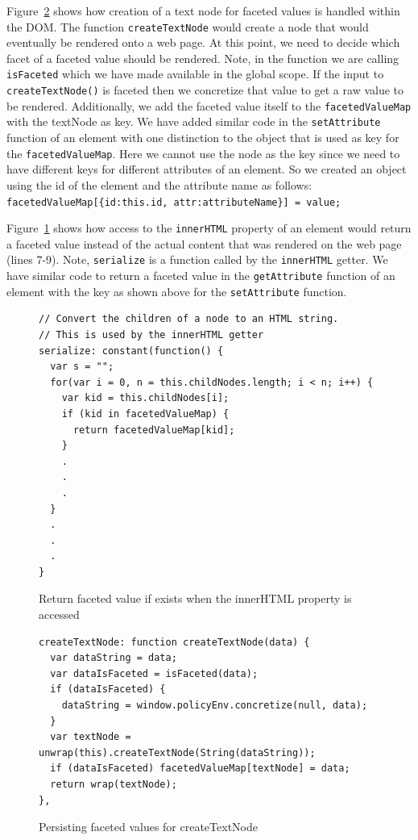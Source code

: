 Figure~\ref{fig:createTextNode} shows how creation of a text node for faceted values
is handled within the DOM. The function \texttt{createTextNode} would create a
node that would eventually be rendered onto a web page. At this point, we need to
decide which facet of a faceted value should be rendered. Note, in the function
we are calling \texttt{isFaceted} which we have made available in the global scope.
If the input to \texttt{createTextNode()} is faceted then we concretize that value
to get a raw value to be rendered. Additionally, we add the faceted value itself
to the \texttt{facetedValueMap} with the textNode as key. We have added similar
code in the \texttt{setAttribute} function of an element with one distinction to
the object that is used as key for the \texttt{facetedValueMap}. Here we cannot
use the node as the key since we need to have different keys for different
attributes of an element. So we created an object using the id of the element and
the attribute name as follows:
\indent\texttt{facetedValueMap[\{id:this.id, attr:attributeName\}] = value;}
\noindent

Figure~\ref{fig:innerHTML} shows how access to the \texttt{innerHTML} property of
an element would return a faceted value instead of the actual content that was
rendered on the web page (lines 7-9). Note, \texttt{serialize} is a function
called by the \texttt{innerHTML} getter. We have similar code to return a faceted
value in the \texttt{getAttribute} function of an element with the key as shown
above for the \texttt{setAttribute} function.

\begin{figure}
  \begin{lstlisting}
// Convert the children of a node to an HTML string.
// This is used by the innerHTML getter
serialize: constant(function() {
  var s = "";
  for(var i = 0, n = this.childNodes.length; i < n; i++) {
    var kid = this.childNodes[i];
    if (kid in facetedValueMap) {
      return facetedValueMap[kid];
    }
    .
    .
    .
  }
  .
  .
  .
}
  \end{lstlisting}
  \caption{Return faceted value if exists when the innerHTML property is accessed}
  \label{fig:innerHTML}
\end{figure}

\begin{figure}
  \begin{lstlisting}
createTextNode: function createTextNode(data) {
  var dataString = data;
  var dataIsFaceted = isFaceted(data);
  if (dataIsFaceted) {
    dataString = window.policyEnv.concretize(null, data);
  }
  var textNode = unwrap(this).createTextNode(String(dataString));
  if (dataIsFaceted) facetedValueMap[textNode] = data;
  return wrap(textNode);
},
  \end{lstlisting}
  \caption{Persisting faceted values for createTextNode}
  \label{fig:createTextNode}
\end{figure}



